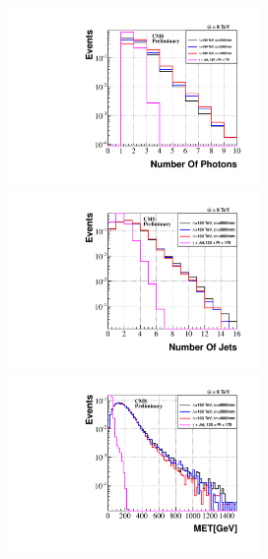 \begin{minipage}{0.90\linewidth} 
\begin{center}
\centering
\mbox{\includegraphics[height=0.5\textwidth,width=0.5\textwidth]{THESISPLOTS/GMSB-SPS8-MODEL-NumberOfPhotons_Lambda-180-TeV.pdf}%
\includegraphics[height=0.5\textwidth,width=0.5\textwidth]{THESISPLOTS/GMSB-SPS8-MODEL-NumberOfJets_Lambda-180-TeV.pdf}} \\
\hspace{0.5cm}
\mbox{\includegraphics[height=0.5\textwidth,width=0.5\textwidth]{THESISPLOTS/GMSB-SPS8-MODEL-Event-MET_Lambda-180-TeV.pdf}}
\label{fig:NKINE}
\end{center}
\end{minipage}
